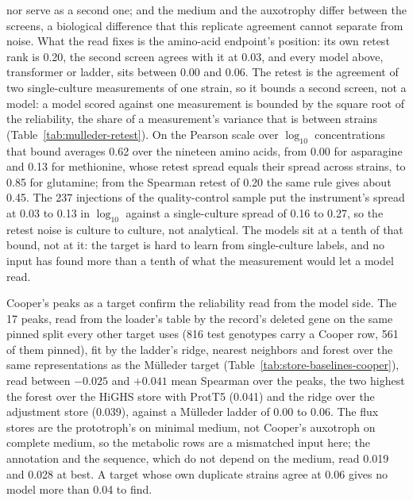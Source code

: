 nor serve as a second one; and the medium and the auxotrophy differ between the screens,
a biological difference that this replicate agreement cannot separate from noise. What
the read fixes is the amino-acid endpoint's position: its own retest rank is 0.20, the
second screen agrees with it at 0.03, and every model above, transformer or ladder,
sits between 0.00 and 0.06. The retest is the agreement of two single-culture
measurements of one strain, so it bounds a second screen, not a model: a model scored
against one measurement is bounded by the square root of the reliability, the share of
a measurement's variance that is between strains (Table~\ref{tab:mulleder-retest}). On
the Pearson scale over $\log_{10}$ concentrations that bound averages 0.62 over the
nineteen amino acids, from 0.00 for asparagine and 0.13 for methionine, whose retest
spread equals their spread across strains, to 0.85 for glutamine; from the Spearman
retest of 0.20 the same rule gives about 0.45. The 237 injections of the quality-control
sample put the instrument's spread at 0.03 to 0.13 in $\log_{10}$ against a
single-culture spread of 0.16 to 0.27, so the retest noise is culture to culture, not
analytical. The models sit at a tenth of that bound, not at it: the target is hard to
learn from single-culture labels, and no input has found more than a tenth of what the
measurement would let a model read.





Cooper's peaks as a target confirm the reliability read from the model side. The 17
peaks, read from the loader's table by the record's deleted gene on the same pinned
split every other target uses (816 test genotypes carry a Cooper row, 561 of them
pinned), fit by the ladder's ridge, nearest neighbors and forest over the same
representations as the M\"ulleder target (Table~\ref{tab:store-baselines-cooper}),
read between $-0.025$ and $+0.041$ mean Spearman over the peaks, the two highest
the forest over the HiGHS store with ProtT5 (0.041) and the ridge over the adjustment
store (0.039), against a M\"ulleder ladder of 0.00 to 0.06. The flux stores are the
prototroph's on minimal medium, not Cooper's auxotroph on complete medium, so the
metabolic rows are a mismatched input here; the annotation and the sequence, which do
not depend on the medium, read 0.019 and 0.028 at best. A target whose own duplicate
strains agree at 0.06 gives no model more than 0.04 to find.

